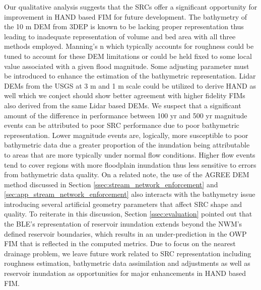 \documentclass[draft]{dependencies/agujournal2019}
\begin{document}
Our qualitative analysis suggests that the SRCs offer a significant opportunity for improvement in HAND based FIM for future development.
The bathymetry of the 10 m DEM from 3DEP is known to be lacking proper representation thus leading to inadequate representation of volume and bed area with all three methods employed.
Manning's n which typically accounts for roughness could be tuned to account for these DEM limitations or could be held fixed to some local value associated with a given flood magnitude.
Some adjusting parameter must be introduced to enhance the estimation of the bathymetric representation.
Lidar DEMs from the USGS at 3 m and 1 m scale could be utilized to derive HAND as well which we conject should show better agreement with higher fidelity FIMs also derived from the same Lidar based DEMs.
We suspect that a significant amount of the difference in performance between 100 yr and 500 yr magnitude events can be attributed to poor SRC performance due to poor bathymetric representation.
Lower magnitude events are, logically, more susceptible to poor bathymetric data due a greater proportion of the inundation being attributable to areas that are more typically under normal flow conditions.
Higher flow events tend to cover regions with more floodplain inundation thus less sensitive to errors from bathymetric data quality.
On a related note, the use of the AGREE DEM method discussed in Section \ref{ssec:stream_network_enforcement} and \ref{sec:app_stream_network_enforcement} also interacts with the bathymetry issue introducing several artificial geometry parameters that affect SRC shape and quality.
To reiterate in this discussion, Section \ref{ssec:evaluation} pointed out that the BLE's representation of reservoir inundation extends beyond the NWM's defined reservoir boundaries, which results in an under-prediction in the OWP FIM that is reflected in the computed metrics.
Due to focus on the nearest drainage problem, we leave future work related to SRC representation including roughness estimation, bathymetric data assimilation and adjustments as well as reservoir inundation as opportunities for major enhancements in HAND based FIM.
\end{document}
